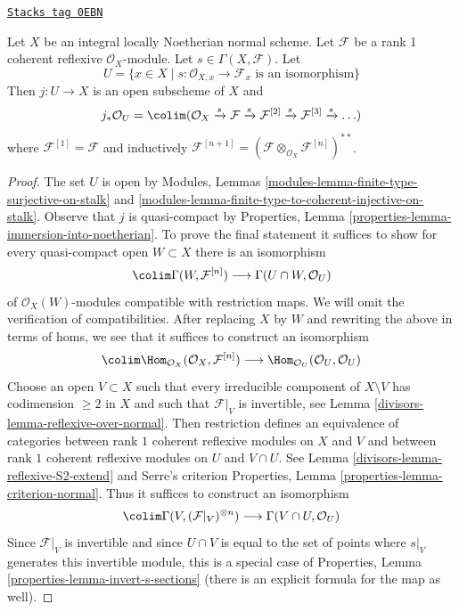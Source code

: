 \begin{lemma}
\label{divisors-lemma-structure-sheaf-Xs}
\href{https://stacks.math.columbia.edu/tag/0EBN}{\texttt{Stacks tag 0EBN}}

Let $X$ be an integral locally Noetherian normal scheme.
Let $\mathcal{F}$ be a rank 1 coherent reflexive $\mathcal{O}_X$-module.
Let $s \in \Gamma(X, \mathcal{F})$. Let
$$
U = \{x \in X \mid s : \mathcal{O}_{X, x} \to \mathcal{F}_x
\text{ is an isomorphism}\}
$$
Then $j : U \to X$ is an open subscheme of $X$ and
$$
j_*\mathcal{O}_U =
\colim (\mathcal{O}_X \xrightarrow{s} \mathcal{F}
\xrightarrow{s} \mathcal{F}^{[2]}
\xrightarrow{s} \mathcal{F}^{[3]}
\xrightarrow{s} \ldots)
$$
where $\mathcal{F}^{[1]} = \mathcal{F}$ and
inductively $\mathcal{F}^{[n + 1]} =
(\mathcal{F} \otimes_{\mathcal{O}_X} \mathcal{F}^{[n]})^{**}$.
\end{lemma}

\begin{proof}

The set $U$ is open by Modules, Lemmas
\ref{modules-lemma-finite-type-surjective-on-stalk} and
\ref{modules-lemma-finite-type-to-coherent-injective-on-stalk}.
Observe that $j$ is quasi-compact by
Properties, Lemma \ref{properties-lemma-immersion-into-noetherian}.
To prove the final statement it suffices to show for every
quasi-compact open $W \subset X$ there is an isomorphism
$$
\colim \Gamma(W, \mathcal{F}^{[n]})
\longrightarrow
\Gamma(U \cap W, \mathcal{O}_U)
$$
of $\mathcal{O}_X(W)$-modules compatible with restriction maps.
We will omit the verification of compatibilities.
After replacing $X$ by $W$ and rewriting the above in
terms of homs, we see that it suffices to construct an isomorphism
$$
\colim \Hom_{\mathcal{O}_X}(\mathcal{O}_X, \mathcal{F}^{[n]})
\longrightarrow
\Hom_{\mathcal{O}_U}(\mathcal{O}_U, \mathcal{O}_U)
$$
Choose an open $V \subset X$ such that every irreducible component of
$X \setminus V$ has codimension $\geq 2$ in $X$ and such that
$\mathcal{F}|_V$ is invertible, see Lemma \ref{divisors-lemma-reflexive-over-normal}.
Then restriction defines an equivalence of categories
between rank $1$ coherent reflexive modules on $X$ and $V$
and between rank $1$ coherent reflexive modules on $U$ and $V \cap U$.
See Lemma \ref{divisors-lemma-reflexive-S2-extend} and Serre's criterion
Properties, Lemma \ref{properties-lemma-criterion-normal}.
Thus it suffices to construct an isomorphism
$$
\colim \Gamma(V, (\mathcal{F}|_V)^{\otimes n}) \longrightarrow
\Gamma(V \cap U, \mathcal{O}_U)
$$
Since $\mathcal{F}|_V$ is invertible and since $U \cap V$ is
equal to the set of points where $s|_V$ generates this invertible module,
this is a special case of
Properties, Lemma \ref{properties-lemma-invert-s-sections}
(there is an explicit formula for the map as well).
\end{proof}

